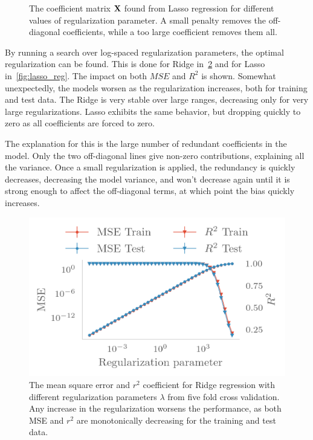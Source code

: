 \begin{figure}[H]
  \caption{\label{fig:lasso_coeff} The coefficient matrix \(\vb{X}\) found from
    Lasso regression for different values of regularization parameter. A small
    penalty removes the off-diagonal coefficients, while a too large coefficient
   removes them all.}
\end{figure}

By running a search over log-spaced regularization parameters, the optimal
regularization can be found. This is done for Ridge in~\cref{fig:ridge_reg} and
for Lasso in~\cref{fig:lasso_reg}. The impact on both \(MSE\) and \(R^{2}\) is
shown. Somewhat unexpectedly, the models worsen as the regularization
increases, both for training and test data. The Ridge is very stable over large
ranges, decreasing only for very large regularizations. Lasso
exhibits the same behavior, but dropping quickly to zero as all coefficients are
forced to zero.

The explanation for this is the large number of redundant coefficients in the
model. Only the two off-diagonal lines give non-zero contributions, explaining
all the variance. Once a small regularization is applied, the redundancy is
quickly decreases, decreasing the model variance, and won't decrease again until it is strong enough to affect
the off-diagonal terms, at which point the bias quickly increases.

\begin{figure}[H]
  \centering
  \includegraphics[]{figures/ridge_reg.png}
  \caption{\label{fig:ridge_reg} The mean square error and \(r^{2}\) coefficient
    for Ridge regression with different regularization parameters \(\lambda\)
    from five fold cross validation.
    Any increase in the regularization worsens the performance, as both MSE and
    \(r^{2}\) are monotonically decreasing for the training and test data.}
\end{figure}


